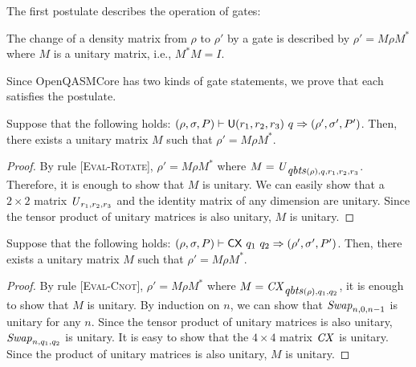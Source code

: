 The first postulate describes the operation of gates:
%
\begin{postulate}[Gate]
	\label{pos:gate}
	The change of a density matrix from $\rho$ to $\rho'$ by a gate is described by
	$\rho'=M\rho M^*$ where $M$ is a unitary matrix, i.e., $M^*M=I$.
\end{postulate}
%
\noindent
%
Since OpenQASMCore has two kinds of gate statements, we prove that each
satisfies the postulate.
%
\begin{theorem}
	\label{thm:rotation}
	Suppose that the following holds:
	$(\rho,\sigma,P)\vdash\mathsf{U}(r_1,r_2,r_3)\ q\Rightarrow(\rho',\sigma',P')$.
	Then, there exists a unitary matrix $M$ such that $\rho'=M\rho M^*$.
\end{theorem}
%
\begin{proof}
	By rule [\textsc{Eval-Rotate}], $\rho'=M\rho M^*$ where
	$M=\mbox{\emph{U}}_{\mbox{\emph{qbts}}(\rho),q,r_1,r_2,r_3}$. Therefore, it is enough to show that
	$M$ is unitary. We can easily show that a $2\times2$ matrix
	$\mbox{\emph{U}}_{r_1,r_2,r_3}$ and the identity matrix of any dimension are unitary.
	Since the tensor product of unitary matrices is also unitary, $M$ is unitary.
\end{proof}
%
\begin{theorem}
	\label{thm:cnot}
	Suppose that the following holds:
	$(\rho,\sigma,P)\vdash\mathsf{CX}\ q_1\ q_2\Rightarrow(\rho',\sigma',P')$.
	Then, there exists a unitary matrix $M$ such that $\rho'=M\rho M^*$.
\end{theorem}
%
\begin{proof}
	By rule [\textsc{Eval-Cnot}], $\rho'=M\rho M^*$ where
	$M=\mbox{\emph{CX}}_{\mbox{\emph{qbts}}(\rho),q_1,q_2}$, it is enough to show that $M$ is unitary. By
	induction on $n$, we can show that $\mbox{\emph{Swap}}_{n,0,n-1}$ is unitary for any $n$.
	Since the tensor product of unitary matrices is also unitary,
	$\mbox{\emph{Swap}}_{n,q_1,q_2}$ is unitary. It is easy to show that the $4\times4$ matrix
	$\mbox{\emph{CX}}_{}$ is unitary. Since the product of unitary matrices is also unitary,
	$M$ is unitary.
\end{proof}

